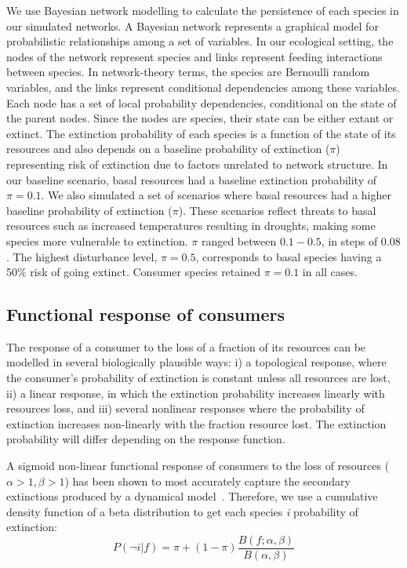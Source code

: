 \documentclass[12pt]{article}
\begin{document}
\begin{spacing}{2.0}
        We use Bayesian network modelling to calculate the persistence of each species in our simulated networks. 
        A Bayesian network represents a graphical model for probabilistic relationships among a set of variables. 
        In our ecological setting, the nodes of the network represent species and links represent feeding interactions between species.
        In network-theory terms, the species are Bernoulli random variables, and the links represent conditional dependencies among these variables. 
        Each node has a set of local probability dependencies, conditional on the state of the parent nodes. 
        Since the nodes are species, their state can be either extant or extinct.
        The extinction probability of each species is a function of the state of its resources and also depends on a baseline probability of extinction ($\pi$) representing risk of extinction due to factors unrelated to network structure.
        In our baseline scenario, basal resources had a baseline extinction probability of $\pi = 0.1$. 
        We also simulated a set of scenarios where basal resources had a higher baseline probability of extinction ($\pi$). 
        These scenarios reflect threats to basal resources such as increased temperatures resulting in droughts, making some species more vulnerable to extinction.
        $\pi$ ranged between $0.1-0.5$, in steps of $0.08$. 
        The highest disturbance level, $\pi = 0.5$, corresponds to basal species having a 50\% risk of going extinct. 
        Consumer species retained $\pi=0.1$ in all cases.


    \subsection{Functional response of consumers}

        The response of a consumer to the loss of a fraction of its resources can be modelled in several biologically plausible ways: i) a topological response, where the consumer's probability of extinction is constant unless all resources are lost, ii) a linear response, in which the extinction probability increases linearly with resources loss, and iii) several nonlinear responses where the probability of extinction increases non-linearly with the fraction resource lost. 
		The extinction probability will differ depending on the response function.
        
        
        A sigmoid non-linear functional response of consumers to the loss of resources ($\alpha >1, \beta >1$) has been shown to most accurately capture the secondary extinctions produced by a dynamical model~\citep{Eklof2013}.
        Therefore, we use a cumulative density function of a beta distribution to get each species \textit{i} probability of extinction:
        \begin{equation}
        \label{betafunc}
        P(\lnot i|f) = \pi + (1 - \pi) \frac{B(f;\alpha,\beta)}{B(\alpha,\beta)}
        \end{equation}
        


\end{spacing}
\end{document}

